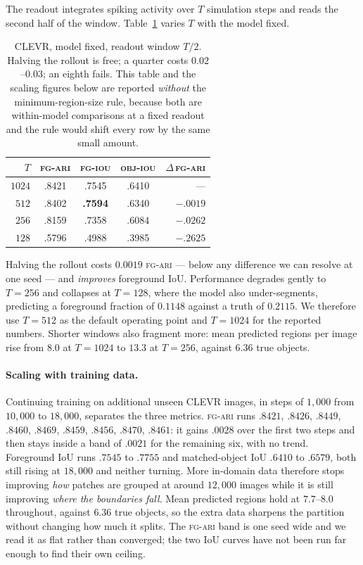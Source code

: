 The readout integrates spiking activity over $T$ simulation steps and reads the second half of the
window. Table~\ref{tab:timestep} varies $T$ with the model fixed.

\begin{table}[!tb]
\centering
\small
\begin{tabular}{r ccc r}
\toprule
$T$ & \textsc{fg-ari} & \textsc{fg-iou} & \textsc{obj-iou} & $\Delta$\,\textsc{fg-ari} \\
\midrule
$1024$ & .8421 & .7545 & .6410 & --- \\
$512$  & .8402 & \textbf{.7594} & .6340 & $-.0019$ \\
$256$  & .8159 & .7358 & .6084 & $-.0262$ \\
$128$  & .5796 & .4988 & .3985 & $-.2625$ \\
\bottomrule
\end{tabular}
\caption{CLEVR, model fixed, readout window $T/2$. Halving the rollout is free; a quarter costs
$0.02$--$0.03$; an eighth fails. This table and the scaling figures below are reported
\emph{without} the minimum-region-size rule, because both are within-model comparisons at a
fixed readout and the rule would shift every row by the same small amount.}
\label{tab:timestep}
\end{table}

Halving the rollout costs $0.0019$ \textsc{fg-ari} --- below any difference we can resolve at one
seed --- and \emph{improves} foreground IoU. Performance degrades gently to $T=256$ and collapses
at $T=128$, where the model also under-segments, predicting a foreground fraction of $0.1148$
against a truth of $0.2115$. We therefore use $T=512$ as the default operating point and $T=1024$
for the reported numbers. Shorter windows also fragment more: mean predicted regions per image
rise from $8.0$ at $T=1024$ to $13.3$ at $T=256$, against $6.36$ true objects.

\paragraph{Scaling with training data.}
Continuing training on additional unseen CLEVR images, in steps of $1{,}000$ from $10{,}000$ to
$18{,}000$, separates the three metrics. \textsc{fg-ari} runs
$.8421$, $.8426$, $.8449$, $.8460$, $.8469$, $.8459$, $.8456$, $.8470$, $.8461$: it gains
$.0028$ over the first two steps and then stays inside a band of $.0021$ for the remaining six,
with no trend. Foreground IoU runs $.7545$ to $.7755$ and matched-object IoU $.6410$ to $.6579$,
both still rising at $18{,}000$ and neither turning. More in-domain data therefore stops improving
\emph{how} patches are grouped at around $12{,}000$ images while it is still improving \emph{where
the boundaries fall}. Mean predicted regions hold at $7.7$--$8.0$ throughout, against $6.36$ true
objects, so the extra data sharpens the partition without changing how much it splits. The
\textsc{fg-ari} band is one seed wide and we read it as flat rather than converged; the two IoU
curves have not been run far enough to find their own ceiling.

